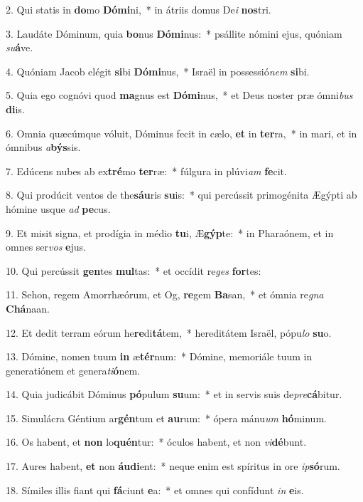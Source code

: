 2. Qui statis in \textbf{do}mo \textbf{Dó}\textbf{mi}ni,~*  in átriis domus De\textit{i} \textbf{nos}tri.\

3. Laudáte Dóminum, quia \textbf{bo}nus \textbf{Dó}\textbf{mi}nus:~*  psállite nómini ejus, quóniam \textit{su}\textbf{á}ve.\

4. Quóniam Jacob elégit \textbf{si}bi \textbf{Dó}\textbf{mi}nus,~*  Israël in possessió\textit{nem} \textbf{si}bi.\

5. Quia ego cognóvi quod \textbf{ma}gnus est \textbf{Dó}\textbf{mi}nus,~*  et Deus noster præ ómni\textit{bus} \textbf{di}is.\

6. Omnia quæcúmque vóluit, Dóminus fecit in cælo, \textbf{et} in \textbf{ter}ra,~*  in mari, et in ómnibus \textit{a}\textbf{býs}sis.\

7. Edúcens nubes ab ex\textbf{tré}mo \textbf{ter}ræ:~*  fúlgura in plúvi\textit{am} \textbf{fe}cit.\

8. Qui prodúcit ventos de the\textbf{sáu}ris \textbf{su}is:~*  qui percússit primogénita Ægýpti ab hómine usque \textit{ad} \textbf{pe}cus.\

9. Et misit signa, et prodígia in médio \textbf{tu}i, Æ\textbf{gýp}te:~*  in Pharaónem, et in omnes ser\textit{vos} \textbf{e}jus.\

10. Qui percússit \textbf{gen}tes \textbf{mul}tas:~*  et occídit re\textit{ges} \textbf{for}tes:\

11. Sehon, regem Amorrhæórum, et Og, \textbf{re}gem \textbf{Ba}san,~*  et ómnia re\textit{gna} \textbf{Chá}naan.\

12. Et dedit terram eórum he\textbf{re}di\textbf{tá}tem,~*  hereditátem Israël, pópu\textit{lo} \textbf{su}o.\

13. Dómine, nomen tuum \textbf{in} æ\textbf{tér}num:~*  Dómine, memoriále tuum in generatiónem et genera\textit{ti}\textbf{ó}nem.\

14. Quia judicábit Dóminus \textbf{pó}pulum \textbf{su}um:~*  et in servis suis de\textit{pre}\textbf{cá}bitur.\

15. Simulácra Géntium ar\textbf{gén}tum et \textbf{au}rum:~*  ópera mánu\textit{um} \textbf{hó}minum.\

16. Os habent, et \textbf{non} lo\textbf{quén}tur:~*  óculos habent, et non \textit{vi}\textbf{dé}bunt.\

17. Aures habent, \textbf{et} non \textbf{áu}\textbf{di}ent:~*  neque enim est spíritus in ore \textit{ip}\textbf{só}rum.\

18. Símiles illis fiant qui \textbf{fá}ciunt \textbf{e}a:~*  et omnes qui confídunt \textit{in} \textbf{e}is.\

